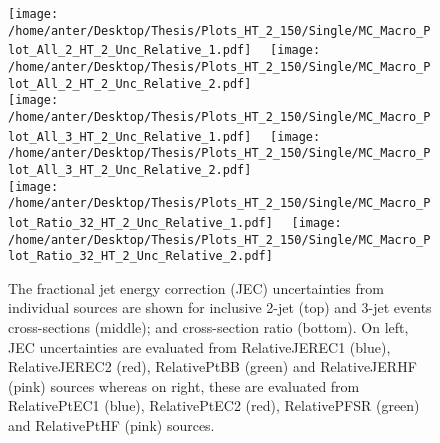 \begin{figure}[!hbtp]
\hspace*{-5mm}\texttt{[image: /home/anter/Desktop/Thesis/Plots\_HT\_2\_150/Single/MC\_Macro\_Plot\_All\_2\_HT\_2\_Unc\_Relative\_1.pdf]}%
~~\texttt{[image: /home/anter/Desktop/Thesis/Plots\_HT\_2\_150/Single/MC\_Macro\_Plot\_All\_2\_HT\_2\_Unc\_Relative\_2.pdf]}\\
\hspace*{-5mm}\texttt{[image: /home/anter/Desktop/Thesis/Plots\_HT\_2\_150/Single/MC\_Macro\_Plot\_All\_3\_HT\_2\_Unc\_Relative\_1.pdf]}%
~~\texttt{[image: /home/anter/Desktop/Thesis/Plots\_HT\_2\_150/Single/MC\_Macro\_Plot\_All\_3\_HT\_2\_Unc\_Relative\_2.pdf]}\\
\hspace*{-5mm}\texttt{[image: /home/anter/Desktop/Thesis/Plots\_HT\_2\_150/Single/MC\_Macro\_Plot\_Ratio\_32\_HT\_2\_Unc\_Relative\_1.pdf]}%
~~\texttt{[image: /home/anter/Desktop/Thesis/Plots\_HT\_2\_150/Single/MC\_Macro\_Plot\_Ratio\_32\_HT\_2\_Unc\_Relative\_2.pdf]}
\caption[The fractional jet energy correction (JEC) uncertainties from individual sources (Part II).]{The fractional jet energy correction (JEC) uncertainties from individual sources are shown for inclusive 2-jet (top) and 3-jet events cross-sections (middle); and cross-section ratio \ratio (bottom). On left, JEC uncertainties are evaluated from RelativeJEREC1 (blue), RelativeJEREC2 (red), RelativePtBB (green) and RelativeJERHF (pink) sources whereas on right, these are evaluated from RelativePtEC1 (blue), RelativePtEC2 (red), RelativePFSR (green) and RelativePtHF (pink) sources.}
\label{fig:jes2}
\end{figure}

